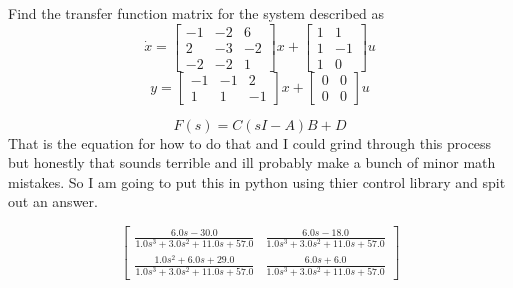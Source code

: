 
\item Find the transfer function matrix for the system described as
  \begin{equation}
\dot x = \begin{bmatrix}
-1 & -2 & 6\\
2 & -3 & -2\\
-2 & -2 & 1
\end{bmatrix}
x + \begin{bmatrix}
1 & 1\\
1 & -1\\
1 & 0
\end{bmatrix}
u\end{equation}
\begin{equation}
y = \begin{bmatrix}
-1 & -1 & 2\\
1 & 1 & -1
\end{bmatrix}
x + \begin{bmatrix}
0 & 0\\
0 & 0
\end{bmatrix}
u\end{equation}

  
  \begin{equation}
    F(s) = C(sI-A)B + D
  \end{equation}
  That is the equation for how to do that and I could grind through this process but honestly that sounds
  terrible and ill probably make a bunch of minor math mistakes. So I am going to put this in python using thier
  control library and spit out an answer.

  \begin{equation}
\begin{bmatrix}
\frac{6.0s - 30.0}{1.0s^{3} + 3.0s^{2} + 11.0s + 57.0} & \frac{6.0s - 18.0}{1.0s^{3} + 3.0s^{2} + 11.0s + 57.0}\\
\frac{1.0s^{2} + 6.0s + 29.0}{1.0s^{3} + 3.0s^{2} + 11.0s + 57.0} & \frac{6.0s + 6.0}{1.0s^{3} + 3.0s^{2} + 11.0s + 57.0}
\end{bmatrix}\end{equation}

  
